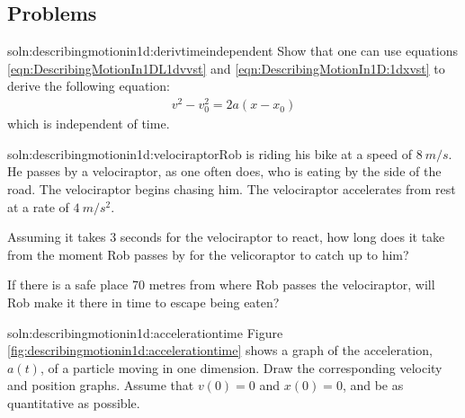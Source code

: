 \subsection{Problems}
\begin{problem}{soln:describingmotionin1d:derivtimeindependent}{
\label{prob:describingmotionin1d:derivtimeindependent} Show that one can use equations \ref{eqn:DescribingMotionIn1DL1dvvst} and \ref{eqn:DescribingMotionIn1D:1dxvst} to derive the following equation:
\begin{align*}
v^2-v_0^2=2a(x-x_0)
\end{align*}
which is independent of time.}
\end{problem}

\begin{problemParts}{soln:describingmotionin1d:velociraptor}{\label{prob:describingmotionin1d:velociraptor}Rob is riding his bike at a speed of $\SI{8}{m/s}$. He passes by a velociraptor, as one often does, who is eating by the side of the road. The velociraptor begins chasing him. The velociraptor accelerates from rest at a rate of $\SI{4}{m/s^2}$.} 
\item Assuming it takes 3 seconds for the velociraptor to react, how long does it take from the moment Rob passes by for the velicoraptor to catch up to him? 
\item If there is a safe place 70 metres from where Rob passes the velociraptor, will Rob make it there in time to escape being eaten?  
\end{problemParts}

\begin{problem}{soln:describingmotionin1d:accelerationtime} {\label{prob:describingmotionin1d:accelerationtime}Figure \ref{fig:describingmotionin1d:accelerationtime} shows a graph of the acceleration, $a(t)$, of a particle moving in one dimension. Draw the corresponding velocity and position graphs. Assume that $v(0)=0$ and $x(0)=0$, and be as quantitative as possible.}
\end{problem}

\newpage
